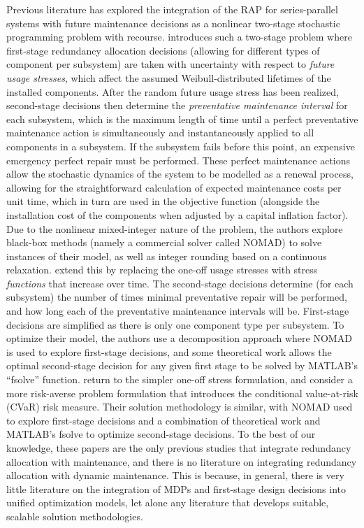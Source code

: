 \documentclass[11pt,authoryear,a4paper]{article}
\theoremstyle{definition}
\begin{document}
{ Previous literature has explored the integration of the RAP for series-parallel systems with future maintenance decisions as a nonlinear two-stage stochastic programming problem with recourse. \cite{bei2017designAndMaintenanceRAP} introduces such a two-stage problem where first-stage redundancy allocation decisions (allowing for different types of component per subsystem) are taken with uncertainty with respect to \emph{future usage stresses}, which affect the assumed Weibull-distributed lifetimes of the installed components. After the random future usage stress has been realized, second-stage decisions then determine the \emph{preventative maintenance interval} for each subsystem, which is the maximum length of time until a perfect preventative maintenance action is simultaneously and instantaneously applied to all components in a subsystem. If the subsystem fails before this point, an expensive emergency perfect repair must be performed. These perfect maintenance actions allow the stochastic dynamics of the system to be modelled as a renewal process, allowing for the {\color{black}straightforward} calculation of expected maintenance costs per unit time, which in turn are used in the objective function (alongside the installation cost of the components when adjusted by a capital inflation factor). Due to the nonlinear mixed-integer nature of the problem, the authors explore black-box methods (namely a commercial solver called NOMAD) to solve instances of their model, as well as integer rounding based on a continuous relaxation.  \cite{zhu2018designAndMaintenanceSequential} extend this by replacing the one-off usage stresses with stress \emph{functions} that increase over time. The second-stage decisions determine (for each subsystem) the number of times minimal preventative repair will be performed, and how long each of the preventative maintenance intervals will be. First-stage decisions are simplified as there is only one component type per subsystem. To optimize their model, the authors use a decomposition approach where NOMAD is used to explore first-stage decisions, and some theoretical work allows the optimal second-stage decision for any given first stage to be solved by MATLAB's ``fsolve'' function. \cite{BEI2019designAndMaintenanceRiskAverse} return to the simpler one-off stress formulation, and consider a more risk-averse problem formulation that introduces the conditional value-at-risk (CVaR) risk measure. Their solution methodology is similar, with NOMAD used to explore first-stage decisions and a combination of theoretical work and MATLAB's fsolve to optimize second-stage decisions. To the best of our knowledge, these papers are the only previous studies that integrate redundancy allocation with maintenance, and there is no literature on integrating redundancy allocation with dynamic maintenance. This is because, in general, there is very little literature on the integration of MDPs and first-stage design decisions into unified optimization models, let alone any literature that develops suitable, scalable solution methodologies. 

}
\end{document}
